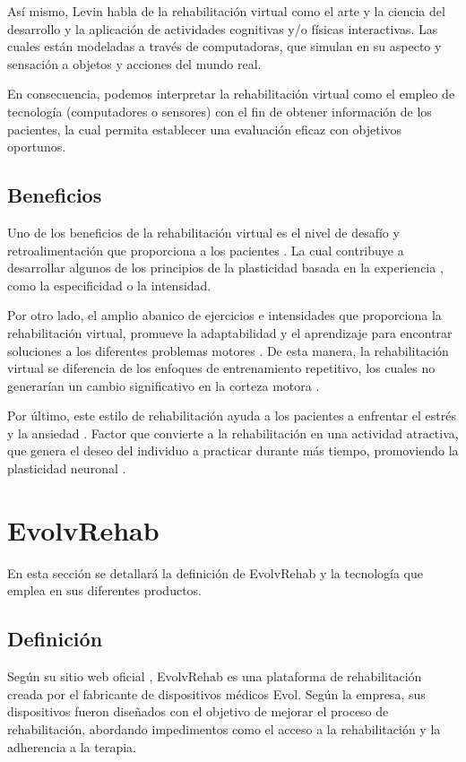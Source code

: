 \documentclass[journal]{IEEEtran}
\begin{document}
Así mismo, Levin \cite{levin2020potential} habla de la rehabilitación virtual como el arte y la ciencia del desarrollo y la aplicación de actividades cognitivas y/o físicas interactivas. Las cuales están modeladas a través de computadoras, que simulan en su aspecto y sensación a objetos y acciones del mundo real. 

En consecuencia, podemos interpretar la rehabilitación virtual como el empleo de tecnología (computadores o sensores) con el fin de obtener información de los pacientes, la cual permita establecer una evaluación eficaz con objetivos oportunos.


\subsection{Beneficios}
Uno de los beneficios de la rehabilitación virtual es el nivel de desafío y retroalimentación que proporciona a los pacientes \cite{levin2020potential}. La cual contribuye a desarrollar algunos de los principios de la plasticidad basada en la experiencia \cite{kleim2008principles}, como la especificidad o la intensidad.

Por otro lado, el amplio abanico de ejercicios e intensidades que proporciona la rehabilitación virtual, promueve la adaptabilidad y el aprendizaje para encontrar soluciones a los diferentes problemas motores \cite{levin2020potential}. De esta manera, la rehabilitación virtual se diferencia de los enfoques de entrenamiento repetitivo, los cuales no generarían un cambio significativo en la corteza motora \cite{levin2020potential, nudo2013recovery}.

Por último, este estilo de rehabilitación ayuda a los pacientes a enfrentar el estrés y la ansiedad \cite{dolatabadi2017toronto}. Factor que convierte a la rehabilitación en una actividad atractiva, que genera el deseo del individuo a practicar durante más tiempo, promoviendo la plasticidad neuronal \cite{levin2020potential}. 

\section{EvolvRehab}
En esta sección se detallará la definición de EvolvRehab y la tecnología que emplea en sus diferentes productos.  

\subsection{Definición}
Según su sitio web oficial \cite{evolvRehab}, EvolvRehab es una plataforma de rehabilitación creada por el fabricante de dispositivos médicos Evol. Según la empresa, sus dispositivos fueron diseñados con el objetivo de mejorar el proceso de rehabilitación, abordando impedimentos como el acceso a la rehabilitación y la adherencia a la terapia.
\end{document}
